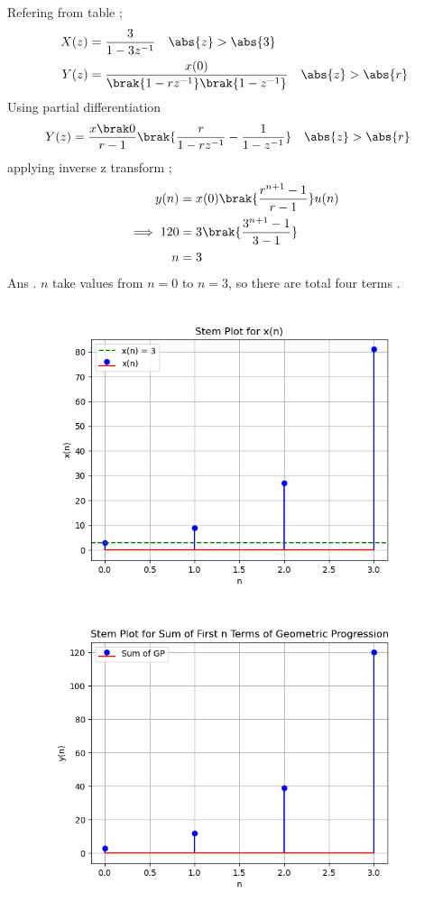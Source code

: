 \documentclass[journal,12pt,twocolumn]{IEEEtran}
\theoremstyle{remark}
\begin{document}
Refering from table ;
\begin{align}
X(z) &=\frac{3}{1-3z^{-1}} \quad \abs{z} > \abs{3}\\
Y(z) &= \frac{x(0)}{\brak{1-rz^{-1}}\brak{1-z^{-1}}} \quad \abs{z}> \abs{r}
\end{align}
Using partial differentiation 
\begin{align}
Y(z)&=\frac{x\brak0}{r-1}\brak{\frac{r}{1-r z^{-1}}-\frac{1}{1- z^{-1}}}  \quad \abs{z} > \abs{r}
\end{align}
applying inverse z transform ;
\begin{align}
y(n) &= x(0)\brak{\frac{r^{n+1}-1}{r-1}}u(n)\\
\implies 120 &= 3\brak{ \frac{3^{n+1}- 1}{3-1}}  \\
n &= 3
\end{align}
Ans . $n$ take values from $n=0$ to  $n=3$, so there are total four terms .
\newpage
\begin{figure}
   \includegraphics[width=1\linewidth]{figs/i1.png}
\end{figure}
\begin{figure}
   \includegraphics[width=1\linewidth]{figs/i2.png}
\end{figure}
\end{document}
